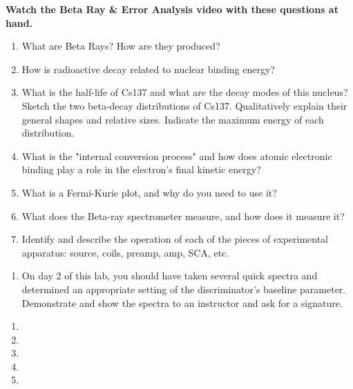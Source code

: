 \documentclass{../signatures}
\begin{document}
\maketitle

\names

\prelab

\textbf{Watch the Beta Ray \& Error Analysis video with these questions at hand.}

\begin{enumerate}

    \item What are Beta Rays? How are they produced?
    
    \item How is radioactive decay related to nuclear binding energy? 

    \item What is the half-life of Cs137 and what are the decay modes of this nucleus? Sketch the two beta-decay distributions of Cs137. Qualitatively explain their general shapes and relative sizes. Indicate the maximum energy of each distribution.

    \item What is the "internal conversion process" and how does atomic electronic binding play a role in the electron's final kinetic energy?

    \item What is a Fermi-Kurie plot, and why do you need to use it?

    \item What does the Beta-ray spectrometer measure, and how does it measure it?

    \item Identify and describe the operation of each of the pieces of experimental apparatus: source, coils, preamp, amp, SCA, etc.
       \\[36pt]
\end{enumerate}

\prelabsignatures

\midlab

\begin{enumerate}

    \item On day 2 of this lab, you should have taken several quick spectra and determined an appropriate setting of the discriminator’s baseline parameter. Demonstrate and show the spectra to an instructor and ask for a signature. 
\\[36pt]
\end{enumerate}


\checkpointsection 

\begin{enumerate}

\item {}

\item {}

\item {}

\item {}

\item {}

\end{enumerate}
\end{document}
